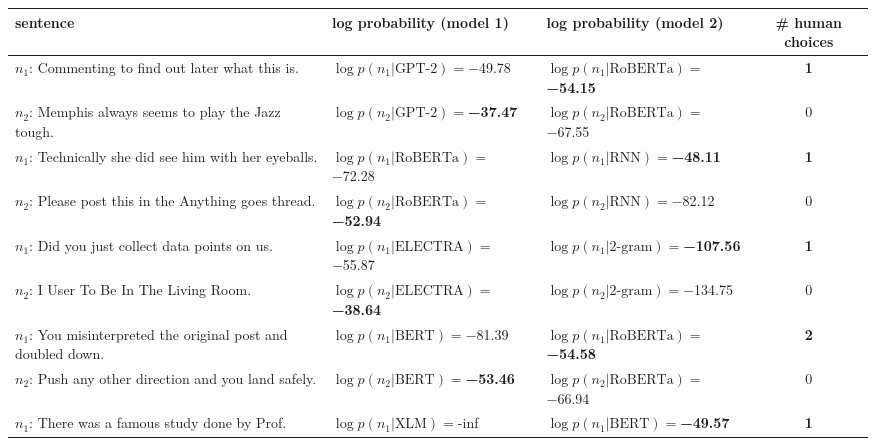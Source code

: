 \begin{tabularx}{\textwidth}{lllc}
\toprule
                                                              sentence &                               log probability (model 1) &                               log probability (model 2) &  \# human choices \\
\midrule
                     $n_1$: Commenting to find out later what this is. &             $\log p(n_1 | \textrm{GPT-2})=$\num{-49.78} &  $\log p(n_1 | \textrm{RoBERTa})=$\textbf{\num{-54.15}} &  \textbf{\num{1}} \\
                   $n_2$: Memphis always seems to play the Jazz tough. &    $\log p(n_2 | \textrm{GPT-2})=$\textbf{\num{-37.47}} &           $\log p(n_2 | \textrm{RoBERTa})=$\num{-67.55} &           \num{0} \\\midrule
                 $n_1$: Technically she did see him with her eyeballs. &           $\log p(n_1 | \textrm{RoBERTa})=$\num{-72.28} &      $\log p(n_1 | \textrm{RNN})=$\textbf{\num{-48.11}} &  \textbf{\num{1}} \\
                  $n_2$: Please post this in the Anything goes thread. &  $\log p(n_2 | \textrm{RoBERTa})=$\textbf{\num{-52.94}} &               $\log p(n_2 | \textrm{RNN})=$\num{-82.12} &           \num{0} \\\midrule
                        $n_1$: Did you just collect data points on us. &           $\log p(n_1 | \textrm{ELECTRA})=$\num{-55.87} &  $\log p(n_1 | \textrm{2-gram})=$\textbf{\num{-107.56}} &  \textbf{\num{1}} \\
                               $n_2$: I User To Be In The Living Room. &  $\log p(n_2 | \textrm{ELECTRA})=$\textbf{\num{-38.64}} &           $\log p(n_2 | \textrm{2-gram})=$\num{-134.75} &           \num{0} \\\midrule
         $n_1$: You misinterpreted the original post and doubled down. &              $\log p(n_1 | \textrm{BERT})=$\num{-81.39} &  $\log p(n_1 | \textrm{RoBERTa})=$\textbf{\num{-54.58}} &  \textbf{\num{2}} \\
                  $n_2$: Push any other direction and you land safely. &     $\log p(n_2 | \textrm{BERT})=$\textbf{\num{-53.46}} &           $\log p(n_2 | \textrm{RoBERTa})=$\num{-66.94} &           \num{0} \\\midrule
                         $n_1$: There was a famous study done by Prof. &                 $\log p(n_1 | \textrm{XLM})=$\num{-inf} &     $\log p(n_1 | \textrm{BERT})=$\textbf{\num{-49.57}} &  \textbf{\num{1}} \\

\end{tabularx}
